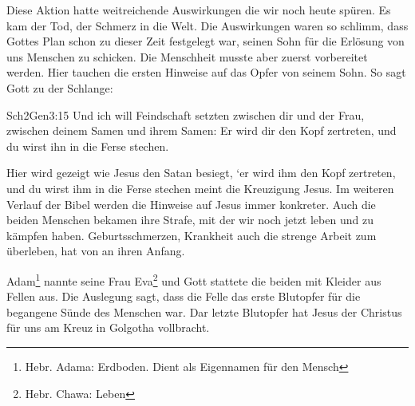 Diese Aktion hatte weitreichende Auswirkungen die wir noch heute spüren. Es kam der Tod, der Schmerz in die Welt. Die Auswirkungen waren so schlimm, dass Gottes Plan schon zu dieser Zeit festgelegt war, seinen Sohn für die Erlösung von uns Menschen zu schicken. Die Menschheit musste aber zuerst vorbereitet werden. Hier tauchen die ersten Hinweise auf das Opfer von seinem Sohn. So sagt Gott zu der Schlange:
\begin{bibeltext}{Sch2}{Gen}{3:15}
	Und ich will Feindschaft setzten zwischen dir und der Frau, zwischen deinem Samen und ihrem Samen: Er wird dir den Kopf zertreten, und du wirst ihn in die Ferse stechen.
\end{bibeltext}
Hier wird gezeigt wie Jesus den Satan besiegt, \textquoteleft{er wird ihm den Kopf zertreten, und du wirst ihm in die Ferse stechen} meint die Kreuzigung Jesus. Im weiteren Verlauf der Bibel werden die Hinweise auf Jesus immer konkreter.
Auch die beiden Menschen bekamen ihre Strafe, mit der wir noch jetzt leben und zu kämpfen haben. Geburtsschmerzen, Krankheit auch die strenge Arbeit zum überleben, hat von an ihren Anfang.

Adam\footnote{Hebr. Adama: Erdboden. Dient als Eigennamen für den Mensch} nannte seine Frau Eva\footnote{Hebr. Chawa: Leben} und Gott stattete die beiden mit Kleider aus Fellen aus. Die Auslegung sagt, dass die Felle das erste Blutopfer für die begangene Sünde des Menschen war. Dar letzte Blutopfer hat Jesus der Christus für uns am Kreuz in Golgotha vollbracht.